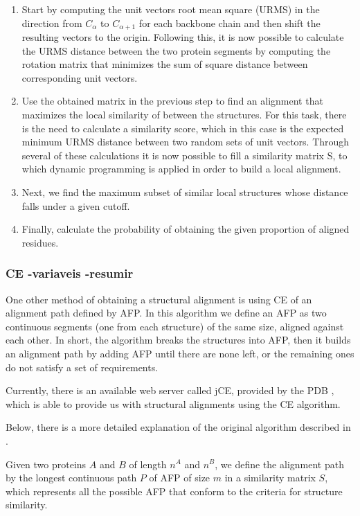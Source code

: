 \begin{enumerate}
	\item Start by computing the unit vectors root mean square (URMS) in the direction from $C_{\alpha}$ to $C_{\alpha+1}$ for each backbone chain and then shift the resulting vectors to the origin. Following this, it is now possible to calculate the URMS distance between the two protein segments by computing the rotation matrix that minimizes the sum of square distance between corresponding unit vectors.
	\item Use the obtained matrix in the previous step to find an alignment that maximizes the local similarity of between the structures. For this task, there is the need to calculate a similarity score, which in this case is the expected minimum URMS distance between two random sets of unit vectors. Through several of these calculations it is now possible to fill a similarity matrix S, to which dynamic programming is applied in order to build a local alignment.
	\item Next, we find the maximum subset of similar local structures whose distance falls under a given cutoff.
	\item Finally, calculate the probability of obtaining the given proportion of aligned residues.	
\end{enumerate}

\subsubsection{CE -variaveis -resumir}
One other method of obtaining a structural alignment is using \gls{CE} of an alignment path defined by \gls{AFP}. In this algorithm we define an AFP as two continuous segments (one from each structure) of the same size, aligned against each other. In short, the algorithm breaks the structures into AFP, then it builds an alignment path by adding AFP until there are none left, or the remaining ones do not satisfy a set of requirements.

Currently, there is an available web server called jCE, provided by the \gls{PDB} \cite{berman2000protein}, which is able to provide us with structural alignments using the CE algorithm.

Below, there is a more detailed explanation of the original algorithm described in \cite{shindyalov1998protein}.

Given two proteins $A$ and $B$ of length $n^A$ and $n^B$, we define the alignment path by the longest continuous path $P$ of AFP of size $m$ in a similarity matrix $S$, which represents all the possible AFP that conform to the criteria for structure similarity.

